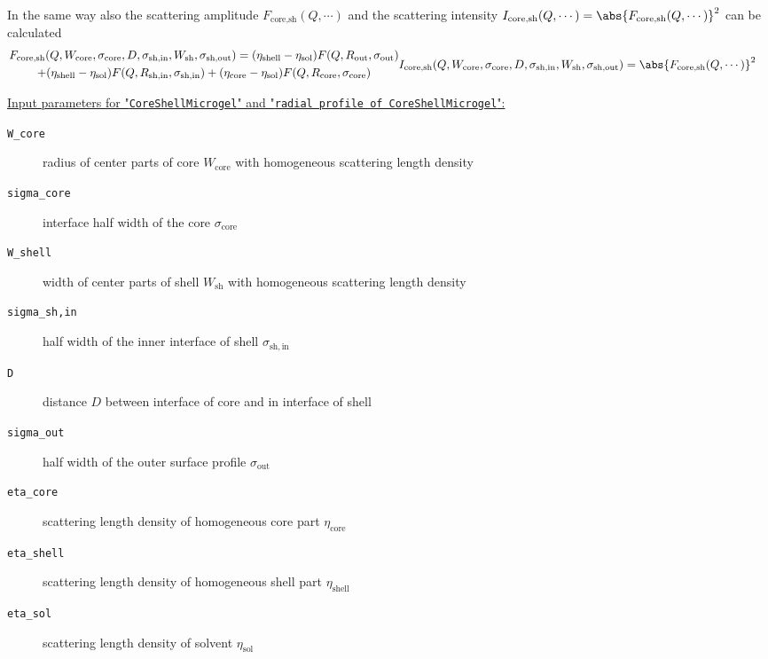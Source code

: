 In the same way also the scattering amplitude $F_\textrm{core,sh}(Q,\cdots)$ and the scattering intensity
$I_\textrm{core,sh}(Q,\cdots)=\abs{F_\textrm{core,sh}(Q,\cdots)}^2$ can be calculated
\begin{subequations}
\begin{multline}
F_\textrm{core,sh}(Q,W_\textrm{core},\sigma_\textrm{core},D,\sigma_\textrm{sh,in},W_\textrm{sh},\sigma_\textrm{sh,out}) =
  (\eta_\textrm{shell}-\eta_\textrm{sol}) F(Q,R_\textrm{out},\sigma_\textrm{out}) \\
+ (\eta_\textrm{shell}-\eta_\textrm{sol}) F(Q,R_\textrm{sh,in},\sigma_\textrm{sh,in})
+ (\eta_\textrm{core} -\eta_\textrm{sol}) F(Q,R_\textrm{core},\sigma_\textrm{core})
\end{multline}
\begin{align}
I_\textrm{core,sh}(Q,W_\textrm{core},\sigma_\textrm{core},D,\sigma_\textrm{sh,in},W_\textrm{sh},\sigma_\textrm{sh,out}) &=
\abs{F_\textrm{core,sh}(Q,\cdots)}^2
\end{align}
\end{subequations}

\vspace{5mm}

\noindent
\underline{Input parameters for "\texttt{CoreShellMicrogel}" and "\texttt{radial profile of CoreShellMicrogel}":}
\begin{description}
    \item[\texttt{W\_core}] radius of center parts of core $W_\textrm{core}$ with homogeneous scattering length density
    \item[\texttt{sigma\_core}] interface half width of the core $\sigma_\mathrm{core}$
    \item[\texttt{W\_shell}] width of center parts of shell $W_\textrm{sh}$ with homogeneous scattering length density
    \item[\texttt{sigma\_sh,in}] half width of the inner interface of shell $\sigma_\mathrm{sh,in}$
    \item[\texttt{D}] distance $D$ between interface of core and in interface of shell
    \item[\texttt{sigma\_out}] half width of the outer surface profile $\sigma_\mathrm{out}$
    \item[\texttt{eta\_core}] scattering length density of homogeneous core part $\eta_\textrm{core}$
    \item[\texttt{eta\_shell}] scattering length density of homogeneous shell part $\eta_\textrm{shell}$
    \item[\texttt{eta\_sol}] scattering length density of solvent $\eta_\textrm{sol}$
\end{description}

